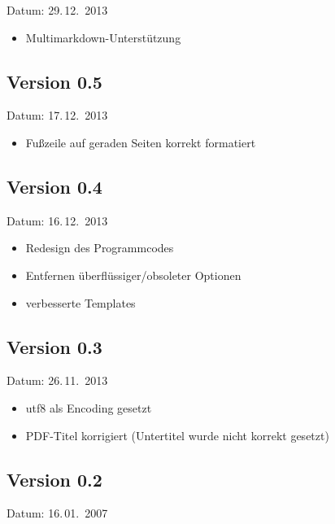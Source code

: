 Datum: 29.\,12.~2013

\begin{itemize}
	\item Multimarkdown-Unterstützung
\end{itemize}

\subsection{Version 0.5}

Datum: 17.\,12.~2013

\begin{itemize}
	\item Fußzeile auf geraden Seiten korrekt formatiert
\end{itemize}

\subsection{Version 0.4}

Datum: 16.\,12.~2013

\begin{itemize}
	\item Redesign des Programmcodes
	\item Entfernen überflüssiger/obsoleter Optionen
	\item verbesserte Templates
\end{itemize}

\subsection{Version 0.3}

Datum: 26.\,11.~2013

\begin{itemize}
	\item utf8 als Encoding gesetzt
	\item PDF-Titel korrigiert (Untertitel wurde nicht korrekt gesetzt)
\end{itemize}

\subsection{Version 0.2}

Datum: 16.\,01.~2007

